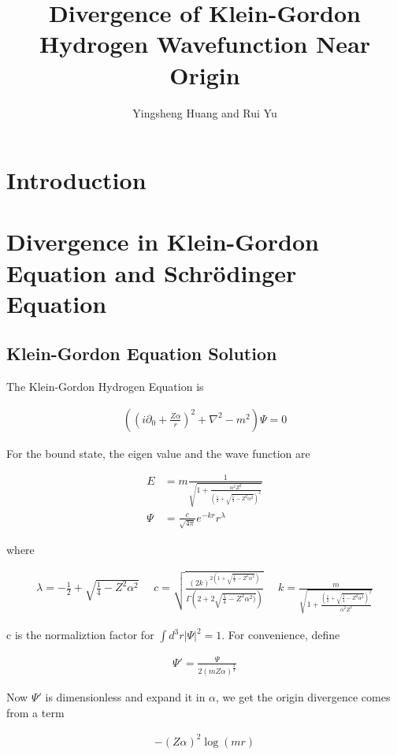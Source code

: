 \documentclass{article}
\title{Divergence of Klein-Gordon Hydrogen Wavefunction Near Origin}
\author{Yingsheng Huang and Rui Yu}
\begin{document}
\maketitle
\section*{Introduction}
\section{Divergence in Klein-Gordon Equation and Schr\"odinger Equation}
\subsection{Klein-Gordon Equation Solution}
The Klein-Gordon Hydrogen Equation is

\begin{align}
	((i\partial_0+\frac{Z\alpha}{r})^2+\nabla^2-m^2)\Psi=0
\end{align}

For the bound state, the eigen value and the wave function are

\begin{align}
	E    & =m\frac{1}{\sqrt{1+\frac{\alpha^2 Z^2}{(\frac{1}{2}+\sqrt{\frac{1}{4}-Z^2\alpha^2})^2}}} \\
	\Psi & =\frac{c}{\sqrt{4\pi}}e^{-kr}r^\lambda
\end{align}

where

\begin{align}
	\lambda=-\frac{1}{2}+\sqrt{\frac{1}{4}-Z^2\alpha^2}\ \ \ \ \ \
	c=\sqrt{\frac{(2k)^{2(1+\sqrt{\frac{1}{4}-Z^2\alpha^2})}}{\Gamma(2+2\sqrt{\frac{1}{4}-Z^2\alpha^2)})}}\ \ \ \ \ \
	k=\frac{m}{\sqrt{1+\frac{(\frac{1}{2}+\sqrt{\frac{1}{4}-Z^2\alpha^2})^2}{\alpha^2Z^2}}}
\end{align}

c is the normaliztion factor for $\int d^3r|\Psi|^2=1$. For convenience, define

\begin{align}
	\Psi '=\frac{\Psi}{2(mZ\alpha)^\frac{3}{2}}
\end{align}

Now $\Psi '$ is dimensionless and expand it in $\alpha$, we get the origin divergence comes from a term

\begin{align}
	-(Z\alpha)^2\log(m r)
\end{align}
\end{document}
